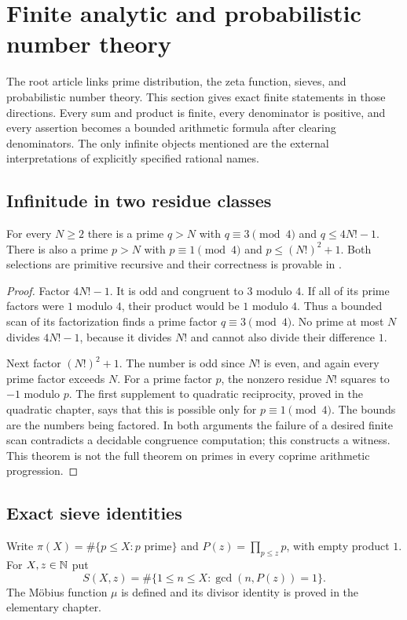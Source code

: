 \section{Finite analytic and probabilistic number theory}\label{sec:analytic}

The root article links prime distribution, the zeta function, sieves, and probabilistic number theory. This section gives exact finite statements in those directions. Every sum and product is finite, every denominator is positive, and every assertion becomes a bounded arithmetic formula after clearing denominators. The only infinite objects mentioned are the external interpretations of explicitly specified rational names.

\subsection{Infinitude in two residue classes}
\begin{theorem}\label{an:progressions}
For every $N\ge2$ there is a prime $q>N$ with $q\equiv3\pmod4$ and $q\le4N!-1$. There is also a prime $p>N$ with $p\equiv1\pmod4$ and $p\le(N!)^2+1$. Both selections are primitive recursive and their correctness is provable in \ipra.
\end{theorem}
\begin{proof}
Factor $4N!-1$. It is odd and congruent to $3$ modulo $4$. If all of its prime factors were $1$ modulo $4$, their product would be $1$ modulo $4$. Thus a bounded scan of its factorization finds a prime factor $q\equiv3\pmod4$. No prime at most $N$ divides $4N!-1$, because it divides $N!$ and cannot also divide their difference $1$.

Next factor $(N!)^2+1$. The number is odd since $N!$ is even, and again every prime factor exceeds $N$. For a prime factor $p$, the nonzero residue $N!$ squares to $-1$ modulo $p$. The first supplement to quadratic reciprocity, proved in the quadratic chapter, says that this is possible only for $p\equiv1\pmod4$. The bounds are the numbers being factored. In both arguments the failure of a desired finite scan contradicts a decidable congruence computation; this constructs a witness. This theorem is not the full theorem on primes in every coprime arithmetic progression.
\end{proof}

\subsection{Exact sieve identities}
Write $\pi(X)=\#\{p\le X:p\text{ prime}\}$ and $P(z)=\prod_{p\le z}p$, with empty product $1$. For $X,z\in\mathbb N$ put
\[
 S(X,z)=\#\{1\le n\le X:\gcd(n,P(z))=1\}.
\]
The M\"obius function $\mu$ is defined and its divisor identity is proved in the elementary chapter.

